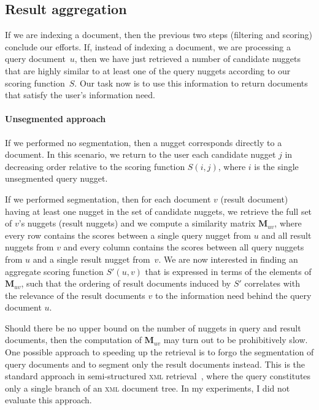 \documentclass[
  digital, %
  notable, %
  lof,     %
  lot,     %
  nopalatino, color
]{fithesis3}
\newif\ifthesis\thesistrue
\def\abbr#1{\textsc{\MakeLowercase{#1}}}
\let\subsubsection=\paragraph
\begin{document}
\subsection{Result aggregation}
\label{sec:segmentation-result-aggregation}
If we are indexing a document, then the previous two steps (filtering and
scoring) conclude our efforts. If, instead of indexing a document, we are
processing a query document~$u$, then we have just retrieved a number of
candidate nuggets that are highly similar to at least one of the query nuggets
according to our scoring function~$S$. Our task now is to use this information
to return documents that satisfy the user's information need.

\subsubsection{Unsegmented approach}
If we performed no segmentation, then a nugget corresponds directly to a
document. In this scenario, we return to the user each candidate nugget $j$ in
decreasing order relative to the scoring function $S(i, j)$, where $i$ is the
single unsegmented query nugget.

If we performed segmentation, then for each document $v$ (result document)
having at least one nugget in the set of candidate nuggets, we retrieve the full
set of $v$'s nuggets (result nuggets) and we compute a similarity matrix
$\mathbf{M}_{uv}$, where every row contains the scores between a single query
nugget from $u$ and all result nuggets from $v$ and every column contains the
scores between all query nuggets from $u$ and a single result nugget from~$v$.
We are now interested in finding an aggregate scoring function $S'(u, v)$ that
is expressed in terms of the elements of $\mathbf{M}_{uv}$\ifthesis, such that
the ordering of result documents induced by $S'$ correlates with the relevance
of the result documents $v$ to the information need behind the query document
$u$\fi.

Should there be no upper bound on the number of nuggets in query and result
documents, then the computation of $\mathbf{M}_{uv}$
may turn out to be prohibitively slow. One possible approach to speeding up the
retrieval is to forgo the segmentation of query documents and to segment only
the result documents instead.  This is the standard approach in semi-structured
\abbr{XML} retrieval~\cite{massetal02}, where the query constitutes only a
single branch of an \abbr{XML}\index{XML@\abbr{XML}} document tree. In my
experiments, I did not evaluate this approach.
\end{document}
